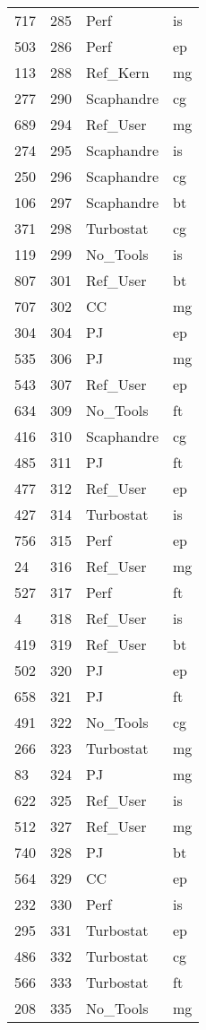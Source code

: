 \begin{tabular}{lrll}
717 & 285 & Perf & is \\
503 & 286 & Perf & ep \\
113 & 288 & Ref_Kern & mg \\
277 & 290 & Scaphandre & cg \\
689 & 294 & Ref_User & mg \\
274 & 295 & Scaphandre & is \\
250 & 296 & Scaphandre & cg \\
106 & 297 & Scaphandre & bt \\
371 & 298 & Turbostat & cg \\
119 & 299 & No_Tools & is \\
807 & 301 & Ref_User & bt \\
707 & 302 & CC & mg \\
304 & 304 & PJ & ep \\
535 & 306 & PJ & mg \\
543 & 307 & Ref_User & ep \\
634 & 309 & No_Tools & ft \\
416 & 310 & Scaphandre & cg \\
485 & 311 & PJ & ft \\
477 & 312 & Ref_User & ep \\
427 & 314 & Turbostat & is \\
756 & 315 & Perf & ep \\
24 & 316 & Ref_User & mg \\
527 & 317 & Perf & ft \\
4 & 318 & Ref_User & is \\
419 & 319 & Ref_User & bt \\
502 & 320 & PJ & ep \\
658 & 321 & PJ & ft \\
491 & 322 & No_Tools & cg \\
266 & 323 & Turbostat & mg \\
83 & 324 & PJ & mg \\
622 & 325 & Ref_User & is \\
512 & 327 & Ref_User & mg \\
740 & 328 & PJ & bt \\
564 & 329 & CC & ep \\
232 & 330 & Perf & is \\
295 & 331 & Turbostat & ep \\
486 & 332 & Turbostat & cg \\
566 & 333 & Turbostat & ft \\
208 & 335 & No_Tools & mg \\

\end{tabular}
